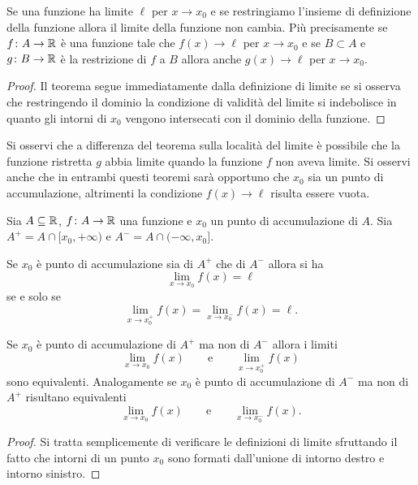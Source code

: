 \begin{theorem}
Se una funzione ha limite $\ell$ per $x\to x_0$ 
e se restringiamo l'insieme di definizione della funzione 
allora il limite della funzione non cambia. 
Più precisamente
se $f\colon A \to {\mathbb R}$ è una funzione tale che $f(x)\to \ell$ per $x\to x_0$
e se $B \subset A$ e $g\colon B\to {\mathbb R}$ è la restrizione di $f$ 
a $B$ allora anche $g(x)\to \ell$ per $x\to x_0$. 
\end{theorem}
%
\begin{proof}
Il teorema segue immediatamente dalla definizione di limite se si osserva
che restringendo il dominio la condizione di validità del limite si indebolisce
in quanto gli intorni di $x_0$ vengono intersecati con il dominio della funzione.
\end{proof}

Si osservi che a differenza del teorema sulla località del limite è
possibile che la funzione ristretta $g$ abbia limite quando la funzione
$f$ non aveva limite.
Si osservi anche che in entrambi questi teoremi sarà opportuno 
che $x_0$ sia un punto di accumulazione, altrimenti la condizione $f(x)\to \ell$ 
risulta essere vuota.

\begin{theorem}%
\mymark{*}%
Sia $A\subseteq {\mathbb R}$, $f\colon A \to {\mathbb R}$ una funzione e $x_0$ un punto di accumulazione
di $A$. Sia $A^+ = A \cap [x_0,+\infty)$ e $A^- = A \cap (-\infty, x_0]$.

Se $x_0$ è punto di accumulazione sia di $A^+$ che di $A^-$
allora si ha
\[
  \lim_{x\to x_0} f(x) = \ell
\]
se e solo se
\[
  \lim_{x\to x_0^+} f(x) = \lim_{x\to x_0^-} f(x) = \ell.
\]

Se $x_0$ è punto di accumulazione di $A^+$ ma non di $A^-$ allora
i limiti
\[
  \lim_{x\to x_0} f(x) \qquad \text{e}\qquad \lim_{x\to x_0^+} f(x)
\]
sono equivalenti. Analogamente se $x_0$ è punto di accumulazione
di $A^-$ ma non di $A^+$ risultano equivalenti
\[
  \lim_{x\to x_0} f(x) \qquad \text{e}\qquad \lim_{x\to x_0^-} f(x).
\]
\end{theorem}
%
\begin{proof}
Si tratta semplicemente di verificare le definizioni di limite sfruttando il fatto che intorni di un punto $x_0$ sono formati dall'unione di intorno destro e intorno sinistro.
\end{proof}

